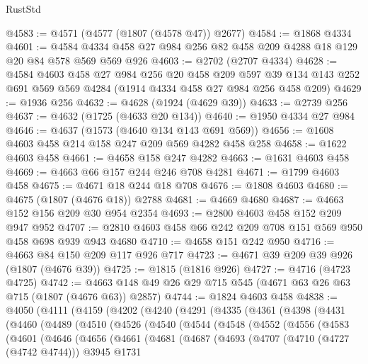 \begin{lexlean}{RustStd}
\begin{coremodule}
@4583 := @4571 (@4577 (@1807 (@4578 @47)) @2677)
@4584 := @1868 @4334
@4601 := @4584 @4334 @458 @27 @984 @256 @82 @458 @209 @4288 @18 @129 @20 @84 @578 @569 @569 @926
@4603 := @2702 (@2707 @4334)
@4628 := @4584
    @4603
    @458
    @27
    @984
    @256
    @20
    @458
    @209
    @597
    @39
    @134
    @143
    @252
    @691
    @569
    @569
    @4284
    (@1914 @4334 @458 @27 @984 @256 @458 @209)
@4629 := @1936 @256
@4632 := @4628 (@1924 (@4629 @39))
@4633 := @2739 @256
@4637 := @4632 (@1725 (@4633 @20 @134))
@4640 := @1950 @4334 @27 @984
@4646 := @4637 (@1573 (@4640 @134 @143 @691 @569))
@4656 := @1608 @4603 @458 @214 @158 @247 @209 @569 @4282 @458 @258
@4658 := @1622 @4603 @458
@4661 := @4658 @158 @247 @4282
@4663 := @1631 @4603 @458
@4669 := @4663 @66 @157 @244 @246 @708 @4281
@4671 := @1799 @4603 @458
@4675 := @4671 @18 @244 @18 @708
@4676 := @1808 @4603
@4680 := @4675 (@1807 (@4676 @18)) @2788
@4681 := @4669 @4680
@4687 := @4663 @152 @156 @209 @30 @954 @2354
@4693 := @2800 @4603 @458 @152 @209 @947 @952
@4707 := @2810 @4603 @458 @66 @242 @209 @708 @151 @569 @950 @458 @698 @939 @943 @4680
@4710 := @4658 @151 @242 @950
@4716 := @4663 @84 @150 @209 @117 @926 @717
@4723 := @4671 @39 @209 @39 @926 (@1807 (@4676 @39))
@4725 := @1815 (@1816 @926)
@4727 := @4716 (@4723 @4725)
@4742 := @4663 @148 @49 @26 @29 @715 @545 (@4671 @63 @26 @63 @715 (@1807 (@4676 @63)) @2857)
@4744 := @1824 @4603 @458
@4838 := @4050
    (@4111
      (@4159
        (@4202
          (@4240
            (@4291
              (@4335
                (@4361
                  (@4398
                    (@4431
                      (@4460
                        (@4489
                          (@4510
                            (@4526
                              (@4540
                                (@4544
                                  (@4548
                                    (@4552
                                      (@4556
                                        (@4583
                                          (@4601
                                            (@4646
                                              (@4656
                                                (@4661
                                                  (@4681
                                                    (@4687
                                                      (@4693
                                                        (@4707
                                                          (@4710 (@4727 (@4742 @4744)))
                                                          @3945
                                                          @1731

\end{coremodule}
\end{lexlean}

